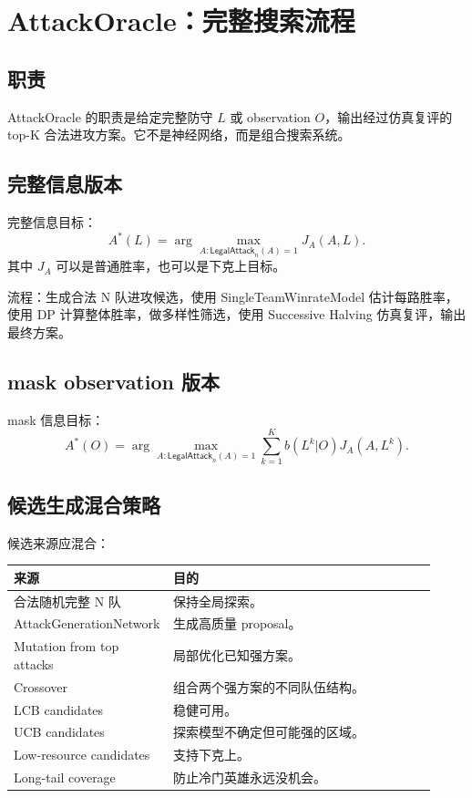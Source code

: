 \documentclass[UTF8,12pt,openany]{ctexbook}
\newcommand{\LegalAttack}{\mathsf{LegalAttack}}
\begin{document}
\chapter{AttackOracle：完整搜索流程}

\section{职责}
AttackOracle 的职责是给定完整防守 $L$ 或 observation $O$，输出经过仿真复评的 top-K 合法进攻方案。它不是神经网络，而是组合搜索系统。

\section{完整信息版本}
完整信息目标：
\begin{equation}
A^*(L)=\arg\max_{A:\LegalAttack_n(A)=1}J_A(A,L).
\end{equation}
其中 $J_A$ 可以是普通胜率，也可以是下克上目标。

流程：生成合法 N 队进攻候选，使用 SingleTeamWinrateModel 估计每路胜率，使用 DP 计算整体胜率，做多样性筛选，使用 Successive Halving 仿真复评，输出最终方案。

\section{mask observation 版本}
mask 信息目标：
\begin{equation}
A^*(O)=\arg\max_{A:\LegalAttack_n(A)=1}\sum_{k=1}^{K}b(L^k|O)J_A(A,L^k).
\end{equation}

\section{候选生成混合策略}
候选来源应混合：
\begin{longtable}{p{0.30\linewidth}p{0.62\linewidth}}
\toprule
来源 & 目的 \\
\midrule
合法随机完整 N 队 & 保持全局探索。\\
AttackGenerationNetwork & 生成高质量 proposal。\\
Mutation from top attacks & 局部优化已知强方案。\\
Crossover & 组合两个强方案的不同队伍结构。\\
LCB candidates & 稳健可用。\\
UCB candidates & 探索模型不确定但可能强的区域。\\
Low-resource candidates & 支持下克上。\\
Long-tail coverage & 防止冷门英雄永远没机会。\\
\bottomrule
\end{longtable}
\end{document}
